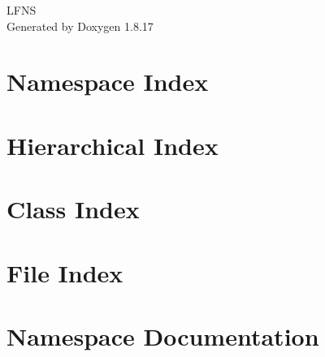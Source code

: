 \let\mypdfximage\pdfximage\def\pdfximage{\immediate\mypdfximage}\documentclass[twoside]{book}
\newcommand{\+}{\discretionary{\mbox{\scriptsize$\hookleftarrow$}}{}{}}
\newcommand{\clearemptydoublepage}{%
  \newpage{\pagestyle{empty}\cleardoublepage}%
}
\begin{document}
\hypersetup{pageanchor=false,
             bookmarksnumbered=true,
             pdfencoding=unicode
            }
\begin{titlepage}
\vspace*{7cm}
\begin{center}%
{\Large L\+F\+NS }\\
\vspace*{1cm}
{\large Generated by Doxygen 1.8.17}\\
\end{center}
\end{titlepage}
\clearemptydoublepage
{}
\tableofcontents
\clearemptydoublepage
{}
\hypersetup{pageanchor=true}

\chapter{Namespace Index}

\chapter{Hierarchical Index}

\chapter{Class Index}

\chapter{File Index}

\chapter{Namespace Documentation}













\end{document}
